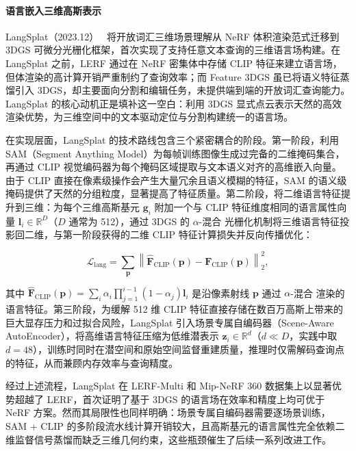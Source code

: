 \paragraph{语言嵌入三维高斯表示}

LangSplat（2023.12）~\cite{2312_16081} 将开放词汇三维场景理解从 NeRF 体积渲染范式迁移到 3DGS 可微分光栅化框架，首次实现了支持任意文本查询的三维语言场构建。在 LangSplat 之前，LERF 通过在 NeRF 密集体中存储 CLIP 特征来建立语言场，但体渲染的高计算开销严重制约了查询效率；而 Feature 3DGS 虽已将语义特征蒸馏引入 3DGS，却主要面向分割和编辑任务，未提供端到端的开放词汇查询能力。LangSplat 的核心动机正是填补这一空白：利用 3DGS 显式点云表示天然的高效渲染优势，为三维空间中的文本驱动定位与分割构建统一的语言场。

在实现层面，LangSplat 的技术路线包含三个紧密耦合的阶段。第一阶段，利用 SAM（Segment Anything Model）为每帧训练图像生成过完备的二维掩码集合，再通过 CLIP 视觉编码器为每个掩码区域提取与文本语义对齐的高维嵌入向量。由于 CLIP 直接在像素级操作会产生大量冗余且语义模糊的特征，SAM 的语义级掩码提供了天然的分组粒度，显著提高了特征质量。第二阶段，将二维语言特征提升到三维：为每个三维高斯基元 $\mathbf{g}_i$ 附加一个与 CLIP 特征维度相同的语言属性向量 $\mathbf{l}_i \in \mathbb{R}^D$（$D$ 通常为 512），通过 3DGS 的 $\alpha$-混合 光栅化机制将三维语言特征投影回二维，与第一阶段获得的二维 CLIP 特征计算损失并反向传播优化：

\begin{equation}
  \mathcal{L}_{\text{lang}} = \sum_{\mathbf{p}} \left\| \hat{\mathbf{F}}_{\text{CLIP}}(\mathbf{p}) - \mathbf{F}_{\text{CLIP}}(\mathbf{p}) \right\|_2^2,
\end{equation}

其中 $\hat{\mathbf{F}}_{\text{CLIP}}(\mathbf{p}) = \sum_{i} \alpha_i \prod_{j=1}^{i-1}(1-\alpha_j) \mathbf{l}_i$ 是沿像素射线 $\mathbf{p}$ 通过 $\alpha$-混合 渲染的语言特征。第三阶段，为缓解 512 维 CLIP 特征直接存储在数百万高斯上带来的巨大显存压力和过拟合风险，LangSplat 引入场景专属自编码器（Scene-Aware AutoEncoder），将高维语言特征压缩为低维潜表示 $\mathbf{z}_i \in \mathbb{R}^d$（$d \ll D$，实践中取 $d=48$），训练时同时在潜空间和原始空间监督重建质量，推理时仅需解码查询点的特征，从而兼顾内存效率与查询精度。

经过上述流程，LangSplat 在 LERF-Multi 和 Mip-NeRF 360 数据集上以显著优势超越了 LERF，首次证明了基于 3DGS 的语言场在效率和精度上均可优于 NeRF 方案。然而其局限性也同样明确：场景专属自编码器需要逐场景训练，SAM + CLIP 的多阶段流水线计算开销较大，且高斯基元的语言属性完全依赖二维监督信号蒸馏而缺乏三维几何约束，这些瓶颈催生了后续一系列改进工作。

